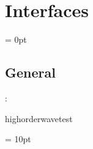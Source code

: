 
\section{Interfaces} 


\parskip = 0pt

\vspace{3mm} \subsection*{General}

: 

highorderwavetest
\vspace{2mm}

\vspace{5mm}\parskip = 10pt 
